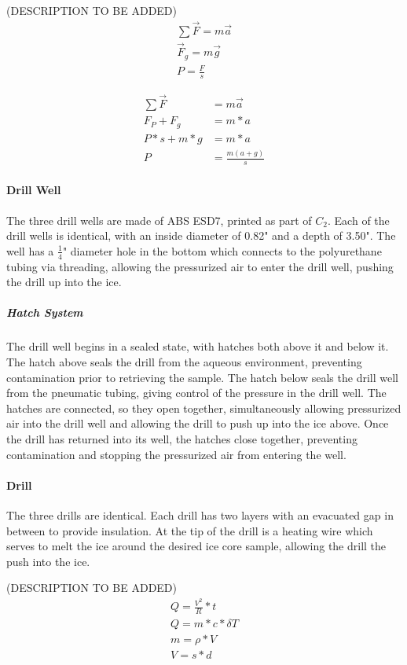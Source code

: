 \documentclass{article}
\begin{document}
(DESCRIPTION TO BE ADDED)
\begin{gather*}
    \sum \vec{F} = m \vec{a} \\
    \vec{F}_g = m \vec{g}\\
    P = \frac{F}{s}
\end{gather*}

\begin{align*}
    \sum \vec{F} &= m \vec{a} \\
    F_P + F_g &= m*a \\
    P*s + m*g &= m*a \\
    P &= \frac{m (a+g)}{s}
\end{align*}

\paragraph{Drill Well}
The three drill wells are made of ABS ESD7, printed as part of $C_2$. Each of the drill wells is identical, with an inside diameter of 0.82" and a depth of 3.50". The well has a $\frac{1}{4}$" diameter hole in the bottom which connects to the polyurethane tubing via threading, allowing the pressurized air to enter the drill well, pushing the drill up into the ice.
\subparagraph{Hatch System}
The drill well begins in a sealed state, with hatches both above it and below it. The hatch above seals the drill from the aqueous environment, preventing contamination prior to retrieving the sample. The hatch below seals the drill well from the pneumatic tubing, giving control of the pressure in the drill well. The hatches are connected, so they open together, simultaneously allowing pressurized air into the drill well and allowing the drill to push up into the ice above. Once the drill has returned into its well, the hatches close together, preventing contamination and stopping the pressurized air from entering the well.
\paragraph{Drill}
The three drills are identical. Each drill has two layers with an evacuated gap in between to provide insulation. At the tip of the drill is a heating wire which serves to melt the ice around the desired ice core sample, allowing the drill the push into the ice.

(DESCRIPTION TO BE ADDED)
\begin{gather*}
    Q = \frac{V^2}{R}*t \\
    Q = m*c*\delta T \\
    m = \rho * V \\
    V = s*d \\
\end{gather*}
\end{document}
